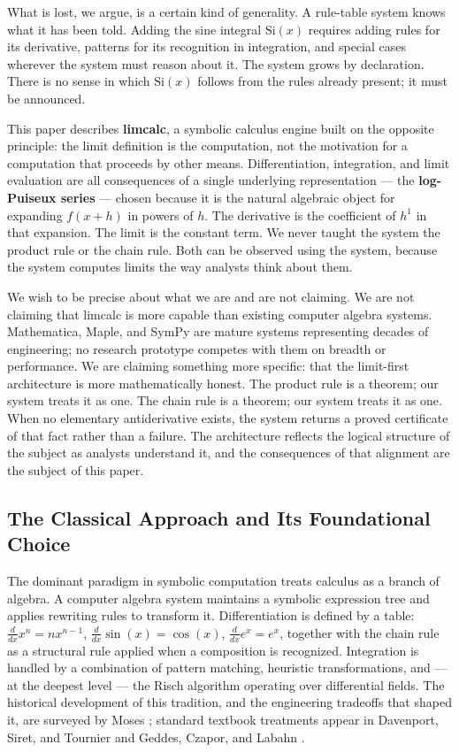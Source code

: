 \documentclass[12pt]{article}
\begin{document}
What is lost, we argue, is a certain kind of generality. A rule-table
system knows what it has been told. Adding the sine integral
\(\mathrm{Si}(x)\) requires adding rules for its derivative, patterns
for its recognition in integration, and special cases wherever the
system must reason about it. The system grows by declaration. There is
no sense in which \(\mathrm{Si}(x)\) follows from the rules already
present; it must be announced.

This paper describes \textbf{limcalc}, a symbolic calculus engine built
on the opposite principle: the limit definition is the computation, not
the motivation for a computation that proceeds by other means.
Differentiation, integration, and limit evaluation are all consequences
of a single underlying representation --- the \textbf{log-Puiseux
series} --- chosen because it is the natural algebraic object for
expanding \(f(x+h)\) in powers of \(h\). The derivative is the
coefficient of \(h^1\) in that expansion. The limit is the constant
term. We never taught the system the product rule or the chain rule.
Both can be observed using the system, because the system computes
limits the way analysts think about them.

We wish to be precise about what we are and are not claiming. We are not
claiming that limcalc is more capable than existing computer algebra
systems. Mathematica, Maple, and SymPy are mature systems representing
decades of engineering; no research prototype competes with them on
breadth or performance. We are claiming something more specific: that
the limit-first architecture is more mathematically honest. The product
rule is a theorem; our system treats it as one. The chain rule is a
theorem; our system treats it as one. When no elementary antiderivative
exists, the system returns a proved certificate of that fact rather than
a failure. The architecture reflects the logical structure of the
subject as analysts understand it, and the consequences of that
alignment are the subject of this paper.


\subsection{The Classical Approach and Its Foundational
Choice}\label{the-classical-approach-and-its-foundational-choice}

The dominant paradigm in symbolic computation treats calculus as a
branch of algebra. A computer algebra system maintains a symbolic
expression tree and applies rewriting rules to transform it.
Differentiation is defined by a table: \(\frac{d}{dx} x^n = nx^{n-1}\),
\(\frac{d}{dx} \sin(x) = \cos(x)\), \(\frac{d}{dx} e^x = e^x\), together
with the chain rule as a structural rule applied when a composition is
recognized. Integration is handled by a combination of pattern matching,
heuristic transformations, and --- at the deepest level --- the Risch
algorithm operating over differential fields. The historical development
of this tradition, and the engineering tradeoffs that shaped it, are
surveyed by Moses \cite{moses1971}; standard textbook treatments appear
in Davenport, Siret, and Tournier \cite{davenport1988} and Geddes,
Czapor, and Labahn \cite{geddes1992}.
\end{document}
